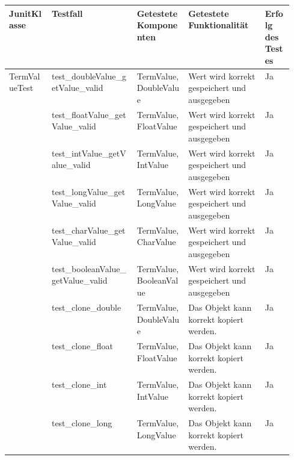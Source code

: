 \documentclass[parskip=full]{scrartcl}
\begin{document}
\begin{landscape}
\begin{table}
    \begin{tabularx}{\linewidth}{ p{0.15\linewidth} | p{0.3\linewidth} | X | X | p{0.1\linewidth}}
    JunitKlasse & Testfall & Getestete Komponenten & Getestete Funktionalität & Erfolg des Testes\\
    \hline
    \multirow{13}{*}{TermValueTest}
        & test\_doubleValue\_getValue\_valid         & TermValue, DoubleValue        & Wert wird korrekt gespeichert und ausgegeben                                  & Ja\\
        & test\_floatValue\_getValue\_valid          & TermValue, FloatValue         & Wert wird korrekt gespeichert und ausgegeben                                  & Ja\\
        & test\_intValue\_getValue\_valid            & TermValue, IntValue           & Wert wird korrekt gespeichert und ausgegeben                                  & Ja\\
        & test\_longValue\_getValue\_valid           & TermValue, LongValue          & Wert wird korrekt gespeichert und ausgegeben                                  & Ja\\
        & test\_charValue\_getValue\_valid           & TermValue, CharValue          & Wert wird korrekt gespeichert und ausgegeben                                  & Ja\\
        & test\_booleanValue\_getValue\_valid        & TermValue, BooleanValue       & Wert wird korrekt gespeichert und ausgegeben                                  & Ja\\
        & test\_clone\_double                        & TermValue, DoubleValue        & Das Objekt kann korrekt kopiert werden.                                       & Ja\\
        & test\_clone\_float                         & TermValue, FloatValue         & Das Objekt kann korrekt kopiert werden.                                       & Ja\\
        & test\_clone\_int                           & TermValue, IntValue           & Das Objekt kann korrekt kopiert werden.                                       & Ja\\
        & test\_clone\_long                          & TermValue, LongValue          & Das Objekt kann korrekt kopiert werden.                                       & Ja\\

\end{tabularx}
\end{table}
\end{landscape}
\end{document}
